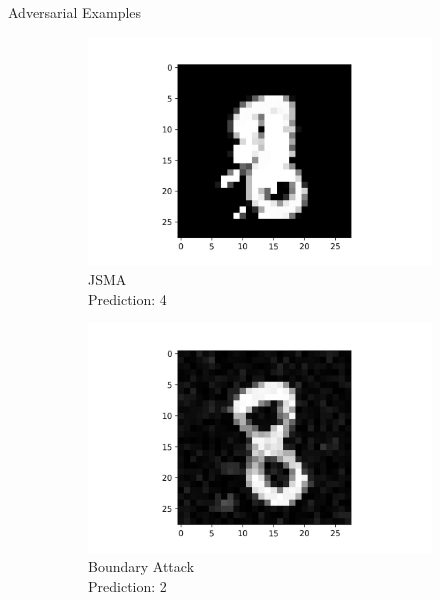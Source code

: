 \documentclass[9pt]{beamer}
\begin{document}
\begin{frame}{Adversarial Examples}
\begin{figure}
\begin{subfigure}[t]{0.23\linewidth}
        \includegraphics[width=\linewidth]{images/JSMA_4.png}
        \caption{JSMA\\Prediction: 4}
    \end{subfigure}
    \begin{subfigure}[t]{0.23\linewidth}
        \centering
        \captionsetup{justification=centering}
        \includegraphics[width=\linewidth]{images/BoundaryAttack_3.png}
        \caption{Boundary Attack\\Prediction: 2}
    \end{subfigure}
    \begin{subfigure}[t]{0.23\linewidth}
        \centering
        \captionsetup{justification=centering}

\end{subfigure}
\end{figure}
\end{frame}
\end{document}
